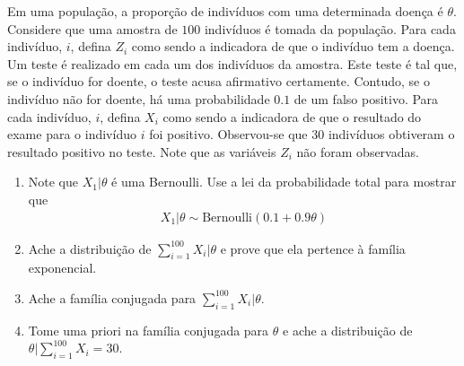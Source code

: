 \begin{exercise}
 Em uma população, a proporção de indivíduos com
 uma determinada doença é $\theta$.
 Considere que uma amostra de $100$ indivíduos é
 tomada da população. Para cada indivíduo, $i$,
 defina $Z_{i}$ como sendo a indicadora de que
 o indivíduo tem a doença.
 Um teste é realizado em cada um
 dos indivíduos da amostra.
 Este teste é tal que, se o indivíduo for doente,
 o teste acusa afirmativo certamente.
 Contudo, se o indivíduo não for doente,
 há uma probabilidade $0.1$ de um falso positivo.
 Para cada indivíduo, $i$, defina
 $X_{i}$ como sendo a indicadora de que
 o resultado do exame para o indivíduo $i$ foi positivo.
 Observou-se que $30$ indivíduos obtiveram
 o resultado positivo no teste.
 Note que as variáveis $Z_{i}$ não foram observadas.
 \begin{enumerate}[label=(\alph*)]
  \item Note que $X_{1}|\theta$ é uma Bernoulli.
  Use a lei da probabilidade total para mostrar que
  \begin{align*}
   X_{1}|\theta \sim \text{Bernoulli}(0.1 + 0.9\theta)
  \end{align*}
  \item Ache a distribuição de
  $\sum_{i=1}^{100}{X_{i}}|\theta$ e
  prove que ela pertence à família exponencial.
  \item Ache a família conjugada para
  $\sum_{i=1}^{100}{X_{i}}|\theta$.
  \item Tome uma priori na família conjugada para
  $\theta$ e ache a distribuição de
  $\theta|\sum_{i=1}^{100}{X_{i}}=30$.
 \end{enumerate}
\end{exercise}

